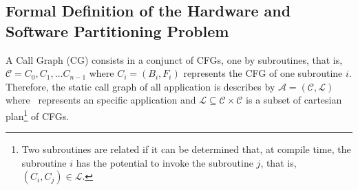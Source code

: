     \subsection{Formal Definition of the Hardware and Software Partitioning Problem} \label{sec:gc}
        A Call Graph (CG) consists in a conjunct of CFGs, one by subroutines, that is, $\mathcal{C} = {C_0, C_1, \dots C_{n-1}}$
        where $ C_i = (B_i, F_i) $ represents the CFG of one subroutine $ i $.
        Therefore, the static call graph of all application is describes by $\mathcal{A} = (\mathcal{C}, \mathcal{L}) \label{eq:a}$
        where \A\ represents an specific application and $ \mathcal{L} \subseteq \mathcal{C} \times \mathcal{C} $ is a subset of cartesian plan\footnote{Two subroutines are related if it can be determined that, at compile time, the subroutine $ i $ has the potential to invoke the subroutine $ j $, that is, $ (C_i, C_j) \in \mathcal{L} $.}
        of CFGs.
        
